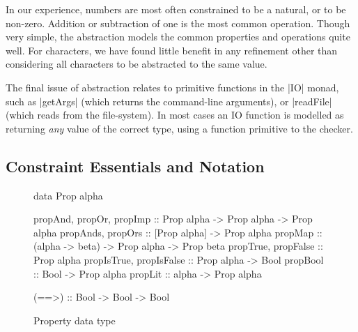 \documentclass[preprint]{sigplanconf}
\begin{document}
In our experience, numbers are most often constrained to be a natural, or to be non-zero. Addition or subtraction of one is the most common operation. Though very simple, the abstraction models the common properties and operations quite well. For characters, we have found little benefit in any refinement other than considering all characters to be abstracted to the same value.

\begin{comment}
Possible abstractions of characters include:

\ignore\begin{code}
data Char = Char
data Char = Alpha | Digit | White | Other
data Char = 'A' .. 'Z' | 'a' .. 'z' | '0' .. '9' | Other
data Char = '\0' | '\1' | '\2' ..
\end{code}

\noindent Catch employs the first abstraction by default, but provides a flag to allow alternatives. In practice, few additional programs are proven safe with a more refined character abstraction.
\end{comment}

The final issue of abstraction relates to primitive functions in the |IO| monad, such as |getArgs| (which returns the command-line arguments), or |readFile| (which reads from the file-system). In most cases an IO function is modelled as returning \textit{any} value of the correct type, using a function primitive to the checker.

\subsection{Constraint Essentials and Notation}
\label{sec:constraints}

\begin{figure}
\begin{code}
data Prop alpha

propAnd, propOr, propImp  :: Prop alpha -> Prop alpha -> Prop alpha
propAnds, propOrs         :: [Prop alpha] -> Prop alpha
propMap                   :: (alpha -> beta) -> Prop alpha -> Prop beta
propTrue, propFalse       :: Prop alpha
propIsTrue, propIsFalse   :: Prop alpha -> Bool
propBool                  :: Bool -> Prop alpha
propLit                   :: alpha -> Prop alpha

(==>) :: Bool -> Bool -> Bool
\end{code}
\caption{Property data type}
\label{fig:prop}
\end{figure}
\end{document}

